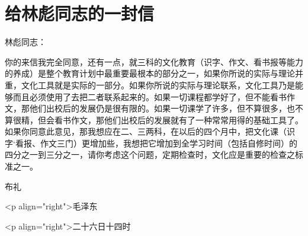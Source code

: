 \section[给林彪同志的一封信（一九三六年）]{给林彪同志的一封信}


林彪同志：

你的来信我完全同意，还有一点，就三科的文化教育（识字、作文、看书报等能力的养成）是整个教育计划中最重要最根本的部分之一，如果你所说的实际与理论并重，文化工具就是实际的一部分。如果你所说的实际与理论联系，文化工具乃是能够而且必须使用了去把二者联系起来的。如果一切课程都学好了，但不能看书作文，那他们出校后的发展仍是很有限的。如果一切课学了许多，但不算很多，也不算很精，但会看书作文，那他们出校后的发展就有了一种常常用得的基础工具了。如果你同意此意见，那我想应在二、三两科，在以后的四个月中，把文化课（识字`看报、作文三门）更增加些，我想把它增加到全学习时间（包括自修时间）的四分之一到三分之一，请你考虑这个问题，定期检查时，文化应是重要的检查之标准之一。

布礼

<p align="right">毛泽东

<p align="right">二十六日十四时

